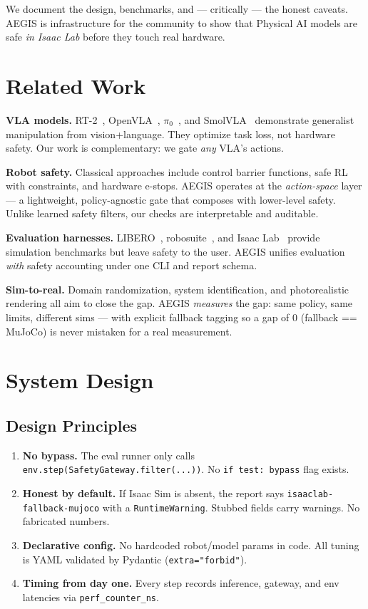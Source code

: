 \documentclass[11pt,a4paper,twocolumn]{article}
\begin{document}
We document the design, benchmarks, and --- critically --- the honest caveats. AEGIS is infrastructure for the community to show that Physical AI models are safe \textit{in Isaac Lab} before they touch real hardware.

\section{Related Work}

\textbf{VLA models.} RT-2~\cite{rt2}, OpenVLA~\cite{openvla}, $\pi_0$~\cite{pi0}, and SmolVLA~\cite{smolvla} demonstrate generalist manipulation from vision+language. They optimize task loss, not hardware safety. Our work is complementary: we gate \textit{any} VLA's actions.

\textbf{Robot safety.} Classical approaches include control barrier functions, safe RL with constraints, and hardware e-stops. AEGIS operates at the \textit{action-space} layer --- a lightweight, policy-agnostic gate that composes with lower-level safety. Unlike learned safety filters, our checks are interpretable and auditable.

\textbf{Evaluation harnesses.} LIBERO~\cite{libero}, robosuite~\cite{robosuite}, and Isaac Lab~\cite{isaaclab} provide simulation benchmarks but leave safety to the user. AEGIS unifies evaluation \textit{with} safety accounting under one CLI and report schema.

\textbf{Sim-to-real.} Domain randomization, system identification, and photorealistic rendering all aim to close the gap. AEGIS \textit{measures} the gap: same policy, same limits, different sims --- with explicit fallback tagging so a gap of 0 (fallback == MuJoCo) is never mistaken for a real measurement.

\section{System Design}

\subsection{Design Principles}

\begin{enumerate}[leftmargin=14pt]
\item \textbf{No bypass.} The eval runner only calls \texttt{env.step(SafetyGateway.filter(...))}. No \texttt{if test: bypass} flag exists.
\item \textbf{Honest by default.} If Isaac Sim is absent, the report says \texttt{isaaclab-fallback-mujoco} with a \texttt{RuntimeWarning}. Stubbed fields carry warnings. No fabricated numbers.
\item \textbf{Declarative config.} No hardcoded robot/model params in code. All tuning is YAML validated by Pydantic (\texttt{extra="forbid"}).
\item \textbf{Timing from day one.} Every step records inference, gateway, and env latencies via \texttt{perf\_counter\_ns}.
\end{enumerate}
\end{document}
